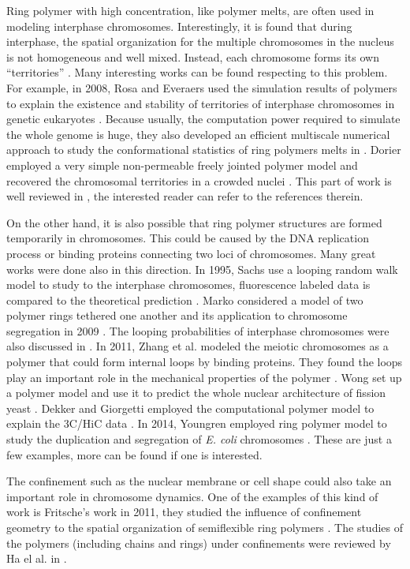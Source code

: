 Ring polymer with high concentration, like polymer melts, are often used in modeling interphase chromosomes. Interestingly, it is found that during interphase, the spatial organization for the multiple chromosomes in the nucleus is not homogeneous and well mixed. Instead, each chromosome forms its own ``territories'' \cite{Halverson2014}. Many interesting works can be found respecting to this problem. For example, in 2008, Rosa and Everaers used the simulation results of polymers to explain the existence and stability of territories of interphase chromosomes in genetic eukaryotes \cite{Rosa2008}. Because usually, the computation power required to simulate the whole genome is huge, they also developed an efficient multiscale numerical approach to study the conformational statistics of ring polymers melts in \cite{Rosa2014b}.  Dorier employed a very simple non-permeable freely jointed polymer model and recovered the chromosomal territories in a crowded nuclei \cite{Dorier2009}. This part of work is well reviewed in \cite{Halverson2014}, the interested reader can refer to the references therein. 

On the other hand, it is also possible that ring polymer structures are formed temporarily in chromosomes. This could be caused by the DNA replication process or binding proteins connecting two loci of chromosomes. Many great works were done also in this direction. In 1995, Sachs use a looping random walk model to study to the interphase chromosomes, fluorescence labeled data is compared to the theoretical prediction \cite{Sachs1995}. Marko considered a model of two polymer rings tethered one another and its application to chromosome segregation in 2009 \cite{Marko2009}.  The looping probabilities of interphase chromosomes were also discussed in \cite{Rosa2010}.  In 2011, Zhang et al. modeled the meiotic chromosomes as a polymer that could form internal loops by binding proteins. They found the loops play an important role in the mechanical properties of the polymer \cite{Zhang2011a}. Wong set up a polymer model and use it to predict the whole nuclear architecture of fission yeast \cite{Wong2012}. Dekker and Giorgetti employed the computational polymer model to explain the 3C/HiC data \cite{Dekker2013,Giorgetti2014}. In 2014, Youngren employed ring polymer model to study the duplication and segregation of \emph{E. coli} chromosomes \cite{Youngren2014}.  These are just a few examples, more can be found if one is interested.

The confinement such as the nuclear membrane or cell shape could also take an important role in chromosome dynamics. One of the examples of this kind of work is Fritsche's work in 2011, they studied the influence of confinement geometry to the spatial organization of semiflexible ring polymers \cite{Fritsche2011}. The studies of the polymers (including chains and rings) under confinements were reviewed by Ha el al. in \cite{Ha2015}. 

